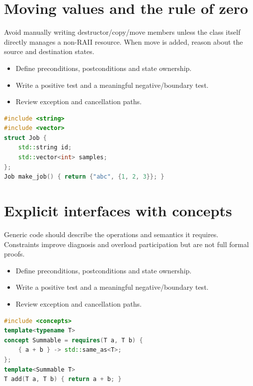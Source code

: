 \documentclass[11pt]{article}
\begin{document}
\section{Moving values and the rule of zero}
Avoid manually writing destructor/copy/move members unless the class itself directly manages a non-RAII resource. When move is added, reason about the source and destination states.

\begin{itemize}[leftmargin=*,itemsep=1pt,topsep=3pt]
\item Define preconditions, postconditions and state ownership.
\item Write a positive test and a meaningful negative/boundary test.
\item Review exception and cancellation paths.
\end{itemize}
\begin{lstlisting}[language=C++]
#include <string>
#include <vector>
struct Job {
    std::string id;
    std::vector<int> samples;
};
Job make_job() { return {"abc", {1, 2, 3}}; }
\end{lstlisting}
\section{Explicit interfaces with concepts}
Generic code should describe the operations and semantics it requires. Constraints improve diagnosis and overload participation but are not full formal proofs.

\begin{itemize}[leftmargin=*,itemsep=1pt,topsep=3pt]
\item Define preconditions, postconditions and state ownership.
\item Write a positive test and a meaningful negative/boundary test.
\item Review exception and cancellation paths.
\end{itemize}
\begin{lstlisting}[language=C++]
#include <concepts>
template<typename T>
concept Summable = requires(T a, T b) {
    { a + b } -> std::same_as<T>;
};
template<Summable T>
T add(T a, T b) { return a + b; }
\end{lstlisting}
\end{document}
